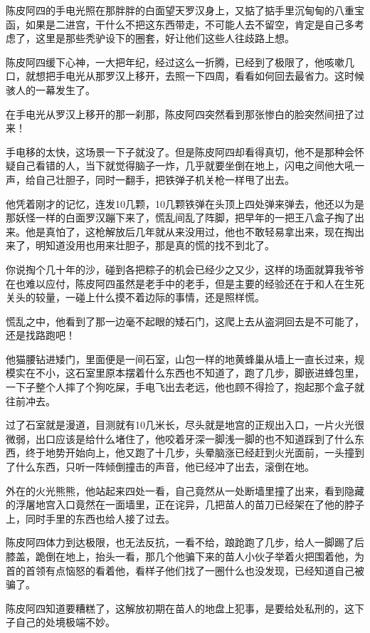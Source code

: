 陈皮阿四的手电光照在那胖胖的白面望天罗汉身上，又掂了掂手里沉甸甸的八重宝函，如果是二进宫，干什么不把这东西带走，不可能人去不留空，肯定是自己多考虑了，这里是那些秃驴设下的圈套，好让他们这些人往歧路上想。

陈皮阿四缓下心神，一大把年纪，经过这么一折腾，已经到了极限了，他咳嗽几口，就想把手电光从那罗汉上移开，去照一下四周，看看如何回去最省力。这时候骇人的一幕发生了。

在手电光从罗汉上移开的那一刹那，陈皮阿四突然看到那张惨白的脸突然间扭了过来！

手电移的太快，这场景一下子就没了。但是陈皮阿四却看得真切，他不是那种会怀疑自己看错的人，当下就觉得脑子一炸，几乎就要坐倒在地上，闪电之间他大吼一声，给自己壮胆子，同时一翻手，把铁弹子机关枪一样甩了出去。

他凭着刚才的记忆，连发10几颗，10几颗铁弹在头顶上四处弹来弹去，他还以为是那妖怪一样的白面罗汉蹦下来了，慌乱间乱了阵脚，把早年的一把王八盒子掏了出来。他是真怕了，这枪解放后几年就从来没用过，他也不敢轻易拿出来，现在掏出来了，明知道没用也用来壮胆子，那是真的慌的找不到北了。

你说掏个几十年的沙，碰到各把粽子的机会已经少之又少，这样的场面就算我爷爷在也难以应付，陈皮阿四虽然是老手中的老手，但是主要的经验还在于和人在生死关头的较量，一碰上什么摸不着边际的事情，还是照样慌。

慌乱之中，他看到了那一边毫不起眼的矮石门，这爬上去从盗洞回去是不可能了，还是找路跑吧！

他猫腰钻进矮门，里面便是一间石室，山包一样的地黄蜂巢从墙上一直长过来，规模实在不小，这石室里原本摆着什么东西也不知道了，跑了几步，脚嵌进蜂包里，一下子整个人摔了个狗吃屎，手电飞出去老远，他也顾不得捡了，抱起那个盒子就往前冲去。

过了石室就是漫道，目测就有10几米长，尽头就是地宫的正规出入口，一片火光很微弱，出口应该是给什么堵住了，他咬着牙深一脚浅一脚的也不知道踩到了什么东西，终于地势开始向上，他又跑了十几步，头晕脑涨已经赶到火光面前，一头撞到了什么东西，只听一阵倾倒撞击的声音，他已经冲了出去，滚倒在地。

外在的火光熊熊，他站起来四处一看，自己竟然从一处断墙里撞了出来，看到隐藏的浮屠地宫入口竟然在一面墙里，正在诧异，几把苗人的苗刀已经架在了他的脖子上，同时手里的东西也给人接了过去。

陈皮阿四体力到达极限，也无法反抗，一看不给，踉跄跑了几步，给人一脚踢了后膝盖，跪倒在地上，抬头一看，那几个他骗下来的苗人小伙子举着火把围着他，为首的首领有点恼怒的看着他，看样子他们找了一圈什么也没发现，已经知道自己被骗了。

陈皮阿四知道要糟糕了，这解放初期在苗人的地盘上犯事，是要给处私刑的，这下子自己的处境极端不妙。

